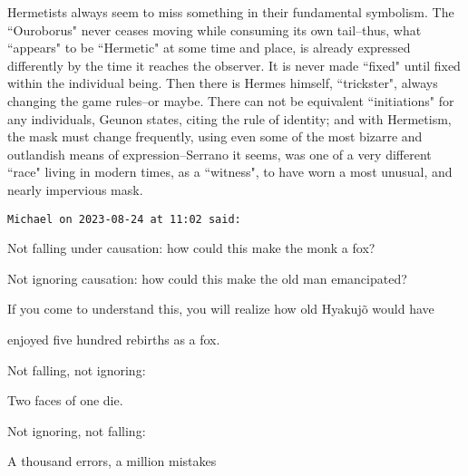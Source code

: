 \begin{footnotesize}
\begin{sffamily}
Hermetists always seem to miss something in their fundamental symbolism. The ``Ouroborus" never ceases moving while consuming its own tail–thus, what ``appears" to be ``Hermetic" at some time and place, is already expressed differently by the time it reaches the observer. It is never made ``fixed" until fixed within the individual being. Then there is Hermes himself, ``trickster", always changing the game rules–or maybe. There can not be equivalent ``initiations" for any individuals, Geunon states, citing the rule of identity; and with Hermetism, the mask must change frequently, using even some of the most bizarre and outlandish means of expression–Serrano it seems, was one of a very different ``race" living in modern times, as a ``witness", to have worn a most unusual, and nearly impervious mask.


\hfill

\texttt{Michael on 2023-08-24 at 11:02 said: }

Not falling under causation: how could this make the monk a fox?

Not ignoring causation: how could this make the old man emancipated?

If you come to understand this, you will realize how old Hyakujõ would have

enjoyed five hundred rebirths as a fox.

Not falling, not ignoring:

Two faces of one die.

Not ignoring, not falling:

A thousand errors, a million mistakes


\end{sffamily}\end{footnotesize}
